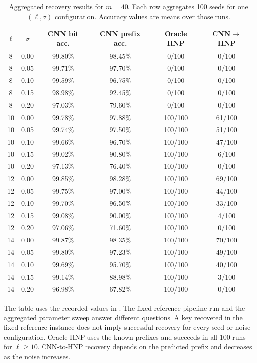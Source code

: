 \documentclass[11pt,a4paper]{article}
\begin{document}
\begin{table}[H]
\centering
\scriptsize
\setlength{\tabcolsep}{4pt}
\renewcommand{\arraystretch}{1.05}
\caption{Aggregated recovery results for $m=40$. Each row aggregates 100 seeds for one $(\ell,\sigma)$ configuration. Accuracy values are means over those runs.}
\label{tab:cnn-hnp-sweep}
\begin{tabular}{cccccc}
\toprule
$\ell$ & $\sigma$ & CNN bit acc. & CNN prefix acc. & Oracle HNP & CNN$\rightarrow$HNP \\
\midrule
8 & 0.00 & 99.80\% & 98.45\% & 0/100 & 0/100 \\
8 & 0.05 & 99.71\% & 97.70\% & 0/100 & 0/100 \\
8 & 0.10 & 99.59\% & 96.75\% & 0/100 & 0/100 \\
8 & 0.15 & 98.98\% & 92.45\% & 0/100 & 0/100 \\
8 & 0.20 & 97.03\% & 79.60\% & 0/100 & 0/100 \\
10 & 0.00 & 99.78\% & 97.88\% & 100/100 & 61/100 \\
10 & 0.05 & 99.74\% & 97.50\% & 100/100 & 51/100 \\
10 & 0.10 & 99.66\% & 96.70\% & 100/100 & 47/100 \\
10 & 0.15 & 99.02\% & 90.80\% & 100/100 & 6/100 \\
10 & 0.20 & 97.13\% & 76.40\% & 100/100 & 0/100 \\
12 & 0.00 & 99.85\% & 98.28\% & 100/100 & 69/100 \\
12 & 0.05 & 99.75\% & 97.00\% & 100/100 & 44/100 \\
12 & 0.10 & 99.70\% & 96.50\% & 100/100 & 33/100 \\
12 & 0.15 & 99.08\% & 90.00\% & 100/100 & 4/100 \\
12 & 0.20 & 97.06\% & 71.60\% & 100/100 & 0/100 \\
14 & 0.00 & 99.87\% & 98.35\% & 100/100 & 70/100 \\
14 & 0.05 & 99.80\% & 97.23\% & 100/100 & 49/100 \\
14 & 0.10 & 99.69\% & 95.70\% & 100/100 & 40/100 \\
14 & 0.15 & 99.14\% & 88.98\% & 100/100 & 3/100 \\
14 & 0.20 & 96.98\% & 67.82\% & 100/100 & 0/100 \\
\bottomrule
\end{tabular}
\end{table}

The table uses the recorded values in . The fixed reference pipeline run and the aggregated parameter sweep answer different questions. A key recovered in the fixed reference instance does not imply successful recovery for every seed or noise configuration. Oracle HNP uses the known prefixes and succeeds in all 100 runs for $\ell\geq10$. CNN-to-HNP recovery depends on the predicted prefix and decreases as the noise increases.
\end{document}
